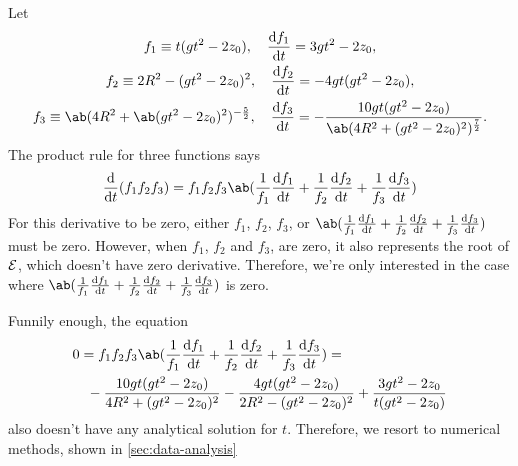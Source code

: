 Let
\begin{gather}
	f_1 \equiv t(gt^2 - 2z_0), \quad \odv{f_1}{t} = 3gt^2 - 2z_0, \\
	f_2 \equiv 2R^2 - (gt^2 - 2z_0)^2, \quad \odv{f_2}{t} = -4gt(gt^2 - 2z_0), \\
	f_3 \equiv \ab(4R^2 + \ab(gt^2 - 2z_0)^2)^{-\frac{5}{2}}, \quad \odv{f_3}{t} = -\frac{10gt(gt^2 - 2z_0)}{\ab(4R^2 + (gt^2 - 2z_0)^2)^{\frac{7}{2}}} .
\end{gather}
The product rule for three functions says
\begin{equation}
	\odv*{(f_1f_2f_3)}{t} = f_1f_2f_3\ab(\frac{1}{f_1}\odv{f_1}{t} + \frac{1}{f_2}\odv{f_2}{t} + \frac{1}{f_3}\odv{f_3}{t})
\end{equation}
For this derivative to be zero, either $f_1$, $f_2$, $f_3$, or $\textstyle\ab(\frac{1}{f_1}\odv{f_1}{t} + \frac{1}{f_2}\odv{f_2}{t} + \frac{1}{f_3}\odv{f_3}{t})$ must be zero. However, when $f_1$, $f_2$ and $f_3$, are zero, it also represents the root of $\mathcal{E}$, which doesn't have zero derivative. Therefore, we're only interested in the case where $\textstyle\ab(\frac{1}{f_1}\odv{f_1}{t} + \frac{1}{f_2}\odv{f_2}{t} + \frac{1}{f_3}\odv{f_3}{t})$ is zero.

Funnily enough, the equation
\begin{equation}
	\begin{multlined}
		0 = f_1f_2f_3\ab(\frac{1}{f_1}\odv{f_1}{t} + \frac{1}{f_2}\odv{f_2}{t} + \frac{1}{f_3}\odv{f_3}{t}) = \\
		-\frac{10gt(gt^2 - 2z_0)}{4R^2 + (gt^2 - 2z_0)^2} - \frac{4gt(gt^2 - 2z_0)}{2R^2 - (gt^2 - 2z_0)^2} + \frac{3gt^2 - 2z_0}{t(gt^2 - 2z_0)}
	\end{multlined}
\end{equation}
also doesn't have any analytical solution for $t$. Therefore, we resort to numerical methods, shown in \cref{sec:data-analysis}

